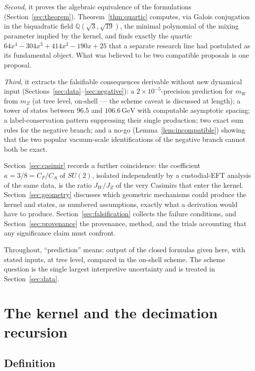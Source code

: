 \documentclass[11pt,a4paper]{article}
\theoremstyle{definition}
\newcommand{\GeV}{\,\mathrm{GeV}}
\begin{document}
\emph{Second}, it proves the algebraic equivalence of the formulations
(Section~\ref{sec:theorem}). Theorem~\ref{thm:quartic} computes, via Galois
conjugation in the biquadratic field $\mathbb{Q}(\sqrt3,\sqrt{19})$, the
minimal polynomial of the mixing parameter implied by the kernel, and finds
exactly the quartic $64x^4-304x^3+414x^2-190x+25$ that a separate research
line had postulated as its fundamental object. What was believed to be two
compatible proposals is one proposal.

\emph{Third}, it extracts the falsifiable consequences derivable without new
dynamical input (Sections~\ref{sec:data}--\ref{sec:negative}): a
$2\times10^{-5}$-precision prediction for $m_W$ from $m_Z$ (at tree level,
on-shell --- the scheme caveat is discussed at length); a tower of states
between $96.5$ and $106.6\GeV$ with computable asymptotic spacing; a
label-conservation pattern suppressing their single production; two exact
sum rules for the negative branch; and a no-go
(Lemma~\ref{lem:incompatible}) showing that the two popular vacuum-scale
identifications of the negative branch cannot both be exact.

Section~\ref{sec:casimir} records a further coincidence: the coefficient
$\kappa=3/8=C_F/C_A$ of $SU(2)$, isolated independently by a custodial-EFT
analysis of the same data, is the ratio $J_W/J_Z$ of the very Casimirs that
enter the kernel. Section~\ref{sec:geometry} discusses which geometric
mechanisms could produce the kernel
\cite{manton1979,forgacsmanton1980,witten1981,salamstrathdee1982,duffnilssonpope1986,hosotani1983,rdss1983}
and states, as numbered assumptions, exactly what a derivation would have to
produce. Section~\ref{sec:falsification} collects the failure conditions,
and Section~\ref{sec:provenance} the provenance, method, and the trials
accounting that any significance claim must confront.

Throughout, ``prediction'' means: output of the closed formulas given here,
with stated inputs, at tree level, compared in the on-shell scheme. The
scheme question is the single largest interpretive uncertainty and is
treated in Section~\ref{sec:data}.

\section{The kernel and the decimation recursion}
\label{sec:kernel}

\subsection{Definition}
\end{document}
